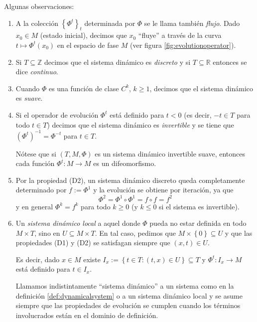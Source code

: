 \documentclass[11pt]{book}
\theoremstyle{definition}
\numberwithin{definition}{section}
\theoremstyle{theorem}
\numberwithin{theorem}{section}
\numberwithin{lemma}{section}
\numberwithin{corollary}{section}
\theoremstyle{plain}
\numberwithin{example}{section}
\begin{document}
Algunas observaciones:

\begin{enumerate}[-]
  \item A la colecci\'on $\left\{ \Phi^t \right\}_t$ determinada por $\Phi$ se
  le llama tambi\'en {\emph{flujo}}. Dado $x_0 \in M$ (estado inicial),
  decimos que $x_0$ ``fluye'' a trav\'es de la curva $t \mapsto \Phi^t \left(
  x_0 \right)$ en el espacio de fase $M$ (ver figura \ref{fig:evolutionoperator}).

  \item Si $T \subseteq \mathbb{Z}$ decimos que el sistema din\'amico es
  {\emph{discreto}} y si $T \subseteq \mathbb{R}$ entonces se dice
  {\emph{continuo}}.

  \item Cuando $\Phi$ es una funci\'on de clase $C^k$, $k \geq 1$,
  decimos que el sistema din\'amico es {\emph{suave}}.

  \item Si el operador de evoluci\'on $\Phi^t$ est\'a definido para $t < 0$
  (es decir, $- t \in T$ para todo $t \in T$) decimos que el sistema
  din\'amico es {\emph{invertible}} y se tiene que $\left( \Phi^t \right)^{-
  1} = \Phi^{- t}$ para $t \in T$.

  N\'otese que si $\left( T, M, \Phi \right)$ es un sistema din\'amico
  invertible suave, entonces cada funci\'on $\Phi^t : M \rightarrow M$ es un
  difeomorfismo.

  \item Por la propiedad (D2), un sistema din\'amico discreto queda
  completamente determinado por $f := \Phi^1$ y la evoluci\'on se obtiene
  por iteraci\'on, ya que
  \[ \Phi^2 = \Phi^1 \circ \Phi^1 = f \circ f = f^2 \]
  y en general $\Phi^k = f^k$ para todo $k \geq 0$ (y $k \leq 0$ si
  el sistema es invertible).

  \item Un {\emph{sistema din\'amico local}} a aquel donde $\Phi$ pueda no
  estar definida en todo $M \times T$, sino en $U \subseteq M \times T$. En
  tal caso, pedimos que $M \times \left\{ 0 \right\} \subseteq U$ y que las
  propiedades (D1) y (D2) se satisfagan siempre que $\left( x, t \right) \in
  U$.

  Es decir, dado $x \in M$ existe $I_x := \left\{ t \in T : \left( t, x
  \right) \in U \right\} \subseteq T$ y $\Phi^t : I_x \rightarrow M$ est\'a
  definido para $t \in I_x$.

  Llamamos indistintamente ``sistema din\'amico'' a un sistema como en la
  definici\'on \ref{def:dynamicalsystem} o a un sistema din\'amico local y se
  asume siempre que las propiedades de evoluci\'on se cumplen cuando los
  t\'erminos involucrados est\'an en el dominio de definici\'on.
\end{enumerate}
\end{document}
